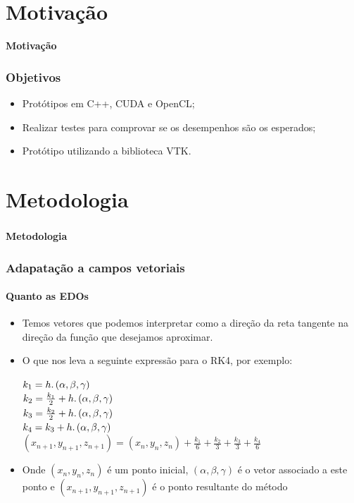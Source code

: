 \documentclass[brazil, 10pt]{beamer}
\begin{document}
\section{Motivação}
\begin{frame}
  \begin{Large}
  \begin{center}
  \textbf{Motivação}
  \end{center}
  \end{Large}
\end{frame}

\begin{frame}
  \frametitle{Objetivos}

  \begin{itemize}
    \item Protótipos em C++, CUDA e OpenCL;
    \item Realizar testes para comprovar se os desempenhos são os esperados;
    \item Protótipo utilizando a biblioteca VTK.
  \end{itemize}
\end{frame}

\section{Metodologia}
\begin{frame}
  \frametitle{}
  \framesubtitle{}
  \begin{Large}
  \begin{center}
  \textbf{Metodologia}
  \end{center}
  \end{Large}
\end{frame}

\begin{frame}
  \frametitle{Adapatação a campos vetoriais}
  \framesubtitle{Quanto as EDOs}
  
  \begin{itemize}
    \item Temos vetores que podemos interpretar como a direção da reta tangente na direção da função que desejamos aproximar.
    \item O que nos leva a seguinte expressão para o RK4, por exemplo:

    $k_{1} = h\ldotp (\alpha ,\beta ,\gamma)$\\
    $k_{2} = \frac{k_{1}}{2} + h\ldotp (\alpha ,\beta ,\gamma)$\\
    $k_{3} = \frac{k_{2}}{2} + h\ldotp (\alpha ,\beta ,\gamma)$\\
    $k_{4} = k_{3} + h\ldotp (\alpha ,\beta ,\gamma )$\\
    $(x_{n+1}, y_{n+1}, z_{n+1}) = (x_{n}, y_{n}, z_{n}) + \frac{k_{1}}{6} + \frac{k_{2}}{3} + \frac{k_{3}}{3} + \frac{k_{4}}{6}$
    
    \item Onde $ (x_{n}, y_{n}, z_{n}) $ é um ponto inicial, $(\alpha ,\beta ,\gamma)$ é o vetor associado a este ponto e $ (x_{n+1}, y_{n+1}, z_{n+1}) $ é o ponto resultante do método
  \end{itemize}


\end{frame}
\end{document}
